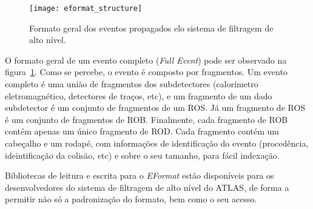 \begin{figure}
\begin{center}
\texttt{[image: eformat\_structure]}
\caption{Formato geral dos eventos propagados elo sistema de filtragem de alto nível.}
\label{fig:eformat_structure}
\end{center}
\end{figure}


O formato geral de um evento completo (\emph{Full Event}) pode ser observado na figura~\ref{fig:eformat_structure}. Como se percebe, o evento é composto por fragmentos. Um evento completo é uma união de fragmentos dos subdetectores (calorímetro eletromagnético, detectores de traços, etc), e um fragmento de um dado subdetector é um conjunto de fragmentos de um ROS. Já um fragmento de ROS é um conjunto de fragmentos de ROB. Finalmente, cada fragmento de ROB contém apenas um único fragmento de ROD. Cada fragmento contém um cabeçalho e um rodapé, com informações de identificação do evento (procedência, ideintificação da colisão, etc) e sobre o seu tamanho, para fácil indexação.

Bibliotecas de leitura e escrita para o \emph{EFormat} estão disponíveis para os desenvolvedores do sistema de filtragem de alto nível do ATLAS, de forma a permitir não só a padronização do formato, bem como o seu acesso.


